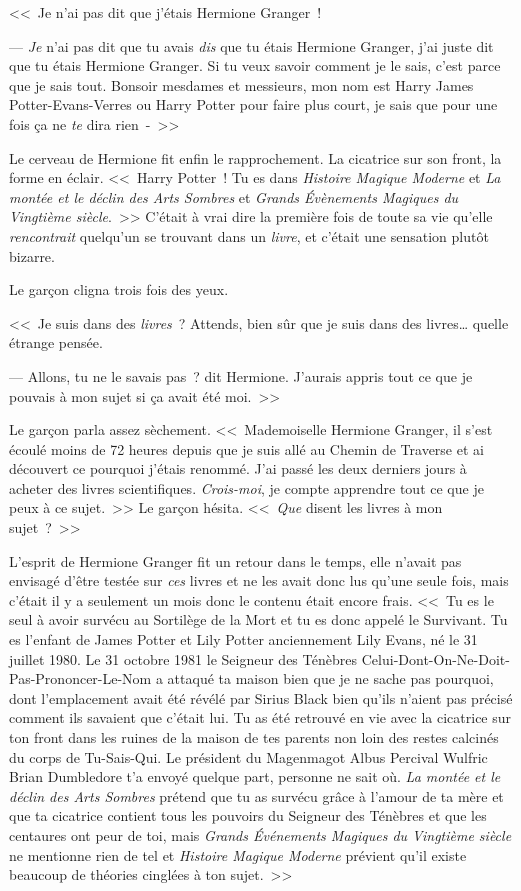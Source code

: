 <<~Je n'ai pas dit que j'étais Hermione Granger~!

--- \emph{Je} n'ai pas dit que tu avais \emph{dis} que tu étais Hermione Granger, j'ai juste dit que tu étais Hermione Granger. Si tu veux savoir comment je le sais, c'est parce que je sais tout. Bonsoir mesdames et messieurs, mon nom est Harry James Potter-Evans-Verres ou Harry Potter pour faire plus court, je sais que pour une fois ça ne \emph{te} dira rien~-~>>

Le cerveau de Hermione fit enfin le rapprochement. La cicatrice sur son front, la forme en éclair. <<~Harry Potter~! Tu es dans \emph{Histoire Magique Moderne} et \emph{La montée et le déclin des Arts Sombres} et \emph{Grands Évènements Magiques du Vingtième siècle}.~>> C'était à vrai dire la première fois de toute sa vie qu'elle \emph{rencontrait} quelqu'un se trouvant dans un \emph{livre}, et c'était une sensation plutôt bizarre.

Le garçon cligna trois fois des yeux.

<<~Je suis dans des \emph{livres}~? Attends, bien sûr que je suis dans des livres… quelle étrange pensée.

--- Allons, tu ne le savais pas~? dit Hermione. J'aurais appris tout ce que je pouvais à mon sujet si ça avait été moi.~>>

Le garçon parla assez sèchement. <<~Mademoiselle Hermione Granger, il s'est écoulé moins de 72 heures depuis que je suis allé au Chemin de Traverse et ai découvert ce pourquoi j'étais renommé. J'ai passé les deux derniers jours à acheter des livres scientifiques. \emph{Crois-moi}, je compte apprendre tout ce que je peux à ce sujet.~>> Le garçon hésita. <<~\emph{Que} disent les livres à mon sujet~?~>>

L'esprit de Hermione Granger fit un retour dans le temps, elle n'avait pas envisagé d'être testée sur \emph{ces} livres et ne les avait donc lus qu'une seule fois, mais c'était il y a seulement un mois donc le contenu était encore frais. <<~Tu es le seul à avoir survécu au Sortilège de la Mort et tu es donc appelé le Survivant. Tu es l'enfant de James Potter et Lily Potter anciennement Lily Evans, né le 31 juillet 1980. Le 31 octobre 1981 le Seigneur des Ténèbres Celui-Dont-On-Ne-Doit-Pas-Prononcer-Le-Nom a attaqué ta maison bien que je ne sache pas pourquoi, dont l'emplacement avait été révélé par Sirius Black bien qu'ils n'aient pas précisé comment ils savaient que c'était lui. Tu as été retrouvé en vie avec la cicatrice sur ton front dans les ruines de la maison de tes parents non loin des restes calcinés du corps de Tu-Sais-Qui. Le président du Magenmagot Albus Percival Wulfric Brian Dumbledore t'a envoyé quelque part, personne ne sait où. \emph{La montée et le déclin des Arts Sombres} prétend que tu as survécu grâce à l'amour de ta mère et que ta cicatrice contient tous les pouvoirs du Seigneur des Ténèbres et que les centaures ont peur de toi, mais \emph{Grands Événements Magiques du Vingtième siècle} ne mentionne rien de tel et \emph{Histoire Magique Moderne} prévient qu'il existe beaucoup de théories cinglées à ton sujet.~>>

